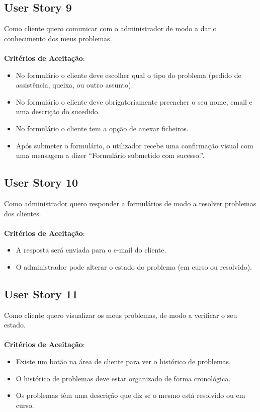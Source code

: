 \documentclass[a4paper,11pt]{article}
\begin{document}
\subsection{User Story 9}
Como cliente quero comunicar com o administrador de modo a dar o conhecimento dos meus problemas.\\\\
\textbf{Critérios de Aceitação}:
\begin{itemize}
  \item No formulário o cliente deve escolher qual o tipo do problema (pedido de assistência, queixa, ou outro assunto).
  \item No formulário o cliente deve obrigatoriamente preencher o seu nome, email e uma descrição do sucedido.
  \item No formulário o cliente tem a opção de anexar ficheiros.
  \item Após submeter o formulário, o utilizador recebe uma confirmação visual com uma mensagem a dizer “Formulário submetido com sucesso.”.
\end{itemize}
\subsection{User Story 10}
Como administrador quero responder a formulários de modo a resolver problemas dos clientes.\\\\
\textbf{Critérios de Aceitação}:
\begin{itemize}
  \item A resposta será enviada para o e-mail do cliente.
  \item O administrador pode alterar o estado do problema (em curso ou resolvido).
\end{itemize}
\subsection{User Story 11}
Como cliente quero visualizar os meus problemas, de modo a verificar o seu estado.\\\\
\textbf{Critérios de Aceitação}:
\begin{itemize}
  \item Existe um botão na área de cliente para ver o histórico de problemas.
  \item O histórico de problemas deve estar organizado de forma cronológica.
  \item Os problemas têm uma descrição que diz se o mesmo está resolvido ou em curso.
\end{itemize}
\end{document}
